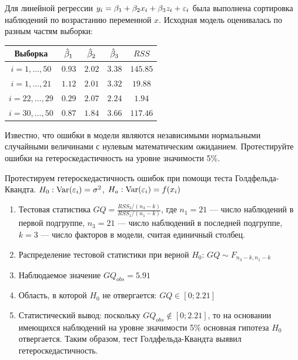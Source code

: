 \begin{problem}
Для линейной регрессии $y_i = \beta_1 + \beta_2 x_i + \beta_3 z_i + \varepsilon_i$ была выполнена сортировка наблюдений по возрастанию переменной $x$. Исходная модель оценивалась по разным частям выборки:

\begin{tabular}{c|cccc}
\toprule
Выборка & $\hat{\beta}_1$ & $\hat{\beta}_2$ & $\hat{\beta}_3$ & $RSS$ \\
\midrule
$i=1,\ldots, 50$ & $0.93$ & $2.02$ & $3.38$ & $145.85$ \\
$i=1,\ldots, 21$ & $1.12$ & $2.01$ & $3.32$ & $19.88$ \\
$i=22,\ldots, 29$ & $0.29$ & $2.07$ & $2.24$ & $1.94$ \\
$i=30,\ldots, 50$ & $0.87$ & $1.84$ & $3.66$ & $117.46$ \\
\bottomrule
\end{tabular}

Известно, что ошибки в модели являются независимыми нормальными случайными величинами с нулевым математическим ожиданием. Протестируйте
ошибки на гетероскедастичность на уровне значимости 5\%.

\begin{sol}
Протестируем гетероскедастичность ошибок при помощи теста Голдфельда-
Квандта. $H_0: \operatorname{Var}(\varepsilon_i)=\sigma^2$, $H_a: \operatorname{Var}(\varepsilon_i)=f(x_i)$

\begin{enumerate}
\item Тестовая статистика $GQ=\frac{RSS_3/(n_3-k)}{RSS_1/(n_1-k)}$, где $n_1=21$ — число наблюдений в первой подгруппе, $n_3=21$ — число наблюдений в
последней подгруппе, $k=3$ — число факторов в модели, считая единичный столбец.
\item Распределение тестовой статистики при верной $H_0$: $GQ\sim F_{n_3-k,n_1-k}$
\item Наблюдаемое значение $GQ_{obs}=5.91$
\item Область, в которой $H_0$ не отвергается: $GQ\in [0;2.21]$
\item Статистический вывод: поскольку $GQ_{obs} \notin [0;2.21]$, то на основании имеющихся наблюдений на уровне значимости 5\% основная гипотеза $H_0$ отвергается. Таким образом, тест Голдфельда-Квандта выявил гетероскедастичность.
\end{enumerate}
\end{sol}
\end{problem}



